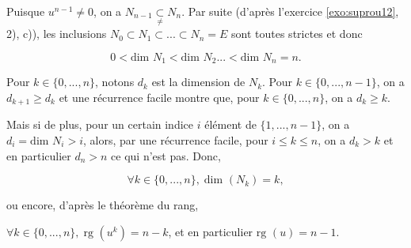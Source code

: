 {\begin{enumerate}
{Puisque $u^{n-1}\neq0$, on a $N_{n-1}\underset{\neq}{\subset}N_n$.
Par suite (d'après l'exercice \ref{exo:suprou12}, 2), c)), les inclusions $N_0\subset N_1\subset...\subset N_n=E$ sont toutes strictes et donc 

$$0<\mbox{dim }N_1<\mbox{dim }N_2 ...<\mbox{dim }N_n=n.$$

Pour $k\in\{0,...,n\}$, notons $d_k$ est la dimension de $N_k$. Pour $k\in\{0,...,n-1\}$, on a $d_{k+1}\geq d_k$ et une récurrence facile montre que, pour $k\in\{0,...,n\}$, on a $d_k\geq k$.

Mais si de plus, pour un certain indice $i$ élément de $\{1,...,n-1\}$, on a $d_i=\mbox{dim }N_i>i$, alors, par une récurrence facile, pour $i\leq k\leq n$, on a $d_k>k$ et en particulier $d_n>n$ ce qui n'est pas. Donc,

$$\forall k\in\{0,...,n\},\;\mbox{dim }(N_k)=k,$$

ou encore, d'après le théorème du rang,

$\forall k\in\{0,...,n\},\;\mbox{rg }(u^k)=n-k$, et en particulier $\mbox{rg }(u)=n-1$.}
\end{enumerate}
}
